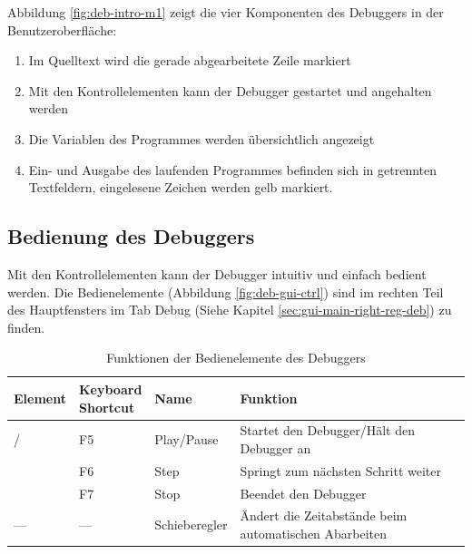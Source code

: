 Abbildung \ref{fig:deb-intro-m1} zeigt die vier Komponenten des Debuggers in der Benutzeroberfläche:
\begin{enumerate}
\item Im Quelltext wird die gerade abgearbeitete Zeile markiert
\item Mit den Kontrollelementen kann der Debugger gestartet und angehalten werden
\item Die Variablen des Programmes werden übersichtlich angezeigt
\item Ein- und Ausgabe des laufenden Programmes befinden sich in getrennten Textfeldern, eingelesene Zeichen werden gelb markiert.
\end{enumerate}



\subsection{Bedienung des Debuggers}

Mit den Kontrollelementen kann der Debugger intuitiv und einfach bedient werden. Die Bedienelemente (Abbildung \ref{fig:deb-gui-ctrl}) sind im rechten Teil des Hauptfensters im Tab \glqq{}Debug\grqq{} (Siehe Kapitel \ref{sec:gui-main-right-reg-deb}) zu finden.

\def\arraystretch{1.4}
\begin{table}[h]
\begin{tabular}{|l|l|l|l|}
	\hline
	Element & \parbox{2cm}{Keyboard\\Shortcut}& Name & Funktion\\
	\hline
	 / \thinspace {} & F5 & Play/Pause & Startet den Debugger/Hält den Debugger an\\
	\thinspace {} & F6 & Step & Springt zum nächsten Schritt weiter\\
	 & F7 & Stop & Beendet den Debugger\\
	--- & --- & Schieberegler & \parbox{7cm}{Ändert die Zeitabstände beim automatischen Abarbeiten}\\
	\hline
\end{tabular}
\caption{Funktionen der Bedienelemente des Debuggers}\label{tab:deb-ctrl}
\end{table}



